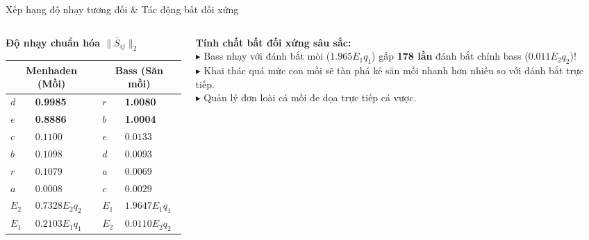 \documentclass[aspectratio=169, 10pt]{beamer}
\begin{document}
\begin{frame}{Xếp hạng độ nhạy tương đối \& Tác động bất đối xứng}
  \begin{columns}[c]
    \begin{column}{0.49\textwidth}
      \begin{block}{\textbf{Độ nhạy chuẩn hóa $\|\bar{S}_{ij}\|_2$}}
        \footnotesize
        \renewcommand{\arraystretch}{1.02}
        \setlength{\tabcolsep}{3pt}
        \begin{tabularx}{\linewidth}{lXlX}
          \toprule
          \multicolumn{2}{c}{\textbf{Menhaden (Mồi)}} & \multicolumn{2}{c}{\textbf{Bass (Săn mồi)}}\\
          \midrule
          $d$ & \textbf{0.9985} & $r$ & \textbf{1.0080}\\
          $e$ & \textbf{0.8886} & $b$ & \textbf{1.0004}\\
          $c$ & $0.1100$        & $e$ & $0.0133$\\
          $b$ & $0.1098$        & $d$ & $0.0093$\\
          $r$ & $0.1079$        & $a$ & $0.0069$\\
          $a$ & $0.0008$        & $c$ & $0.0029$\\
          \midrule
          $E_2$ & \textbf{$0.7328E_2q_2$} & $E_1$ & \textbf{$1.9647E_1q_1$}\\
          $E_1$ & $0.2103E_1q_1$          & $E_2$ & $0.0110E_2q_2$\\
          \bottomrule
        \end{tabularx}\\[3pt]
        \par
      \end{block}
    \end{column}

    \begin{column}{0.49\textwidth}
      \begin{tcolorbox}[colback=red!5, colframe=red!75!black, arc=1.5mm, left=2.5mm, right=2.5mm, top=1.8mm, bottom=1.8mm]
        \small
        \textbf{Tính chất bất đối xứng sâu sắc:}\\[3pt]
        \footnotesize
        $\blacktriangleright$ Bass nhạy với đánh bắt mòi ($1.965E_1q_1$) gấp \textbf{178 lần} đánh bắt chính bass ($0.011E_2q_2$)!\\
        $\blacktriangleright$ Khai thác quá mức con mồi sẽ tàn phá kẻ săn mồi nhanh hơn nhiều so với đánh bắt trực tiếp.\\
        $\blacktriangleright$ Quản lý đơn loài cá mồi đe dọa trực tiếp cá vược.
      \end{tcolorbox}


\end{column}
\end{columns}
\end{frame}
\end{document}
